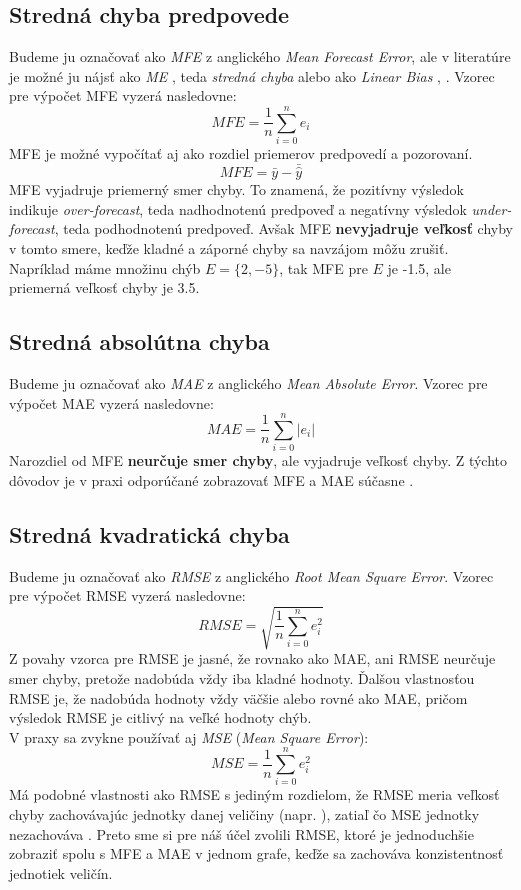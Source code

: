 \subsection{Stredná chyba predpovede}
Budeme ju označovať ako \textit{MFE} z anglického \textit{Mean Forecast Error}, ale v literatúre je možné ju nájsť ako \textit{ME} \cite{RecommendOnVerif}, teda \textit{stredná chyba} alebo ako \textit{Linear Bias} \cite{ContinuousVerif}, \cite{IntroToVerif}. Vzorec pre výpočet MFE vyzerá nasledovne:
\[
	MFE = \frac{1}{n}\sum\limits_{i=0}^{n}  e_i  
\]
MFE je možné vypočítať aj ako rozdiel priemerov predpovedí a pozorovaní.
\[
	MFE = \bar{y} - \bar{\hat{y}}  
\]
MFE vyjadruje priemerný smer chyby. To znamená, že pozitívny výsledok indikuje \textit{over-forecast}, teda nadhodnotenú predpoveď a negatívny výsledok \textit{under-forecast}, teda podhodnotenú predpoveď. Avšak MFE \textbf{nevyjadruje veľkosť} chyby v tomto smere, keďže kladné a záporné chyby sa navzájom môžu zrušiť. 
Napríklad máme množinu chýb $ E = \{2, -5\} $, tak MFE pre $ E $ je -1.5, ale priemerná veľkosť chyby je 3.5.  

\subsection{Stredná absolútna chyba}
Budeme ju označovať ako \textit{MAE} z anglického \textit{Mean Absolute Error}. Vzorec pre výpočet MAE vyzerá nasledovne:
\[
	MAE = \frac{1}{n}\sum\limits_{i=0}^{n} \lvert e_i \rvert 
\]
Narozdiel od MFE \textbf{neurčuje smer chyby}, ale vyjadruje veľkosť chyby. Z týchto dôvodov je v praxi odporúčané zobrazovať MFE a MAE súčasne \cite{RecommendOnVerif}. 

\subsection{Stredná kvadratická chyba}
Budeme ju označovať ako \textit{RMSE} z anglického \textit{Root Mean Square Error}. Vzorec pre výpočet RMSE vyzerá nasledovne:
\[
	RMSE = \sqrt{ \frac{1}{n}\sum\limits_{i=0}^{n} e_i^{2}  }
\]
Z povahy vzorca pre RMSE je jasné, že rovnako ako MAE, ani RMSE neurčuje smer chyby, pretože nadobúda vždy iba kladné hodnoty. 
Ďalšou vlastnosťou RMSE je, že nadobúda hodnoty vždy väčšie alebo rovné ako MAE, pričom výsledok RMSE je citlivý na veľké hodnoty chýb. \\
\label{subsec:mse}
V praxy sa zvykne používať aj \textit{MSE} (\textit{Mean Square Error}):
\[
	MSE = \frac{1}{n}\sum\limits_{i=0}^{n} e_i^{2} 
\]
Má podobné vlastnosti ako RMSE s jediným rozdielom, že RMSE meria veľkosť chyby zachovávajúc jednotky danej veličiny (napr. \textcelsius), zatiaľ čo MSE jednotky nezachováva \cite{RecommendOnVerif}. Preto sme si pre náš účel zvolili RMSE, ktoré je jednoduchšie zobraziť spolu s MFE a MAE v jednom grafe, keďže sa zachováva konzistentnosť jednotiek veličín.



